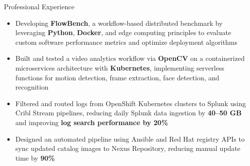 \documentclass{resume}
\begin{document}
 \begin{experienceSection}{Professional Experience}
    \experienceItem[
        company={Arizona State University},
        location={Tempe, AZ},
        position={Research Assistant, VISA Lab},
        duration={Jun 2025 - Present}
    ]
    \begin{itemize}
        \itemsep -6pt {}
        \item Developing \textbf{FlowBench}, a workflow-based distributed benchmark by leveraging \textbf{Python}, \textbf{Docker}, and edge computing principles to evaluate custom software performance metrics and optimize deployment algorithms
        \item Built and tested a video analytics workflow via \textbf{OpenCV} on a containerized microservices architecture with \textbf{Kubernetes}, implementing serverless functions for motion detection, frame extraction, face detection, and recognition
    \end{itemize}

    \experienceItem[
        company={Arch Mortgage Insurance},
        location={Greensboro, NC},
        position={Site Reliability Engineer (SRE) Intern},
        duration={Jun 2024 - Aug 2024}
    ]
    \begin{itemize}
        \itemsep -6pt {}
        \item Filtered and routed logs from OpenShift Kubernetes clusters to Splunk using Cribl Stream pipelines, reducing daily Splunk data ingestion by \textbf{40–50 GB} and improving \textbf{log search performance by 20\%}
        \item Designed an automated pipeline using Ansible and Red Hat registry APIs to sync updated catalog images to Nexus Repository, reducing manual update time by \textbf{ 90\%}
        
    \end{itemize}


\end{experienceSection}
\end{document}
